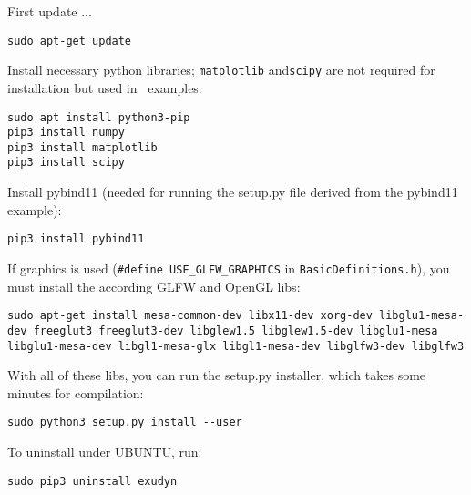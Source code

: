 \noindent First update ...
\begin{lstlisting}[firstnumber=1]
sudo apt-get update
\end{lstlisting}

\noindent Install necessary python libraries; \texttt{matplotlib} and\texttt{scipy} are not required for installation but used in \codeName\ examples:
\begin{lstlisting}[firstnumber=1]
sudo apt install python3-pip
pip3 install numpy
pip3 install matplotlib
pip3 install scipy
\end{lstlisting}

\noindent Install pybind11 (needed for running the setup.py file derived from the pybind11 example):
\begin{lstlisting}[firstnumber=1]
pip3 install pybind11
\end{lstlisting}

\noindent If graphics is used (\texttt{\#define USE\_GLFW\_GRAPHICS} in \texttt{BasicDefinitions.h}), you must install the according GLFW and OpenGL libs:
\begin{lstlisting}[firstnumber=1]
sudo apt-get install mesa-common-dev libx11-dev xorg-dev libglu1-mesa-dev freeglut3 freeglut3-dev libglew1.5 libglew1.5-dev libglu1-mesa libglu1-mesa-dev libgl1-mesa-glx libgl1-mesa-dev libglfw3-dev libglfw3
\end{lstlisting}

\noindent With all of these libs, you can run the setup.py installer, which takes some minutes for compilation:
\begin{lstlisting}[firstnumber=1]
sudo python3 setup.py install --user
\end{lstlisting}

\noindent To uninstall under UBUNTU, run:
\bi
  \item[] \texttt{sudo pip3 uninstall exudyn}
\ei

